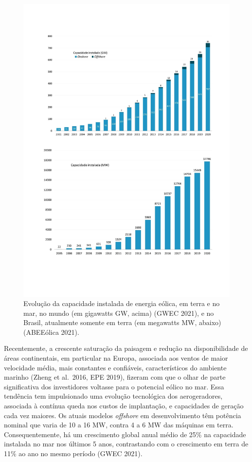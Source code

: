 \documentclass[
  oneside]{scrbook}
\begin{document}
\begin{figure}[H]

{\centering \includegraphics[width=0.75\linewidth]{imagens/cap08/Figura_8.1ab} 

}

\caption{Evolução da capacidade instalada de energia eólica, em terra e no mar, no mundo (em gigawatts GW, acima) (GWEC 2021), e no Brasil, atualmente somente em terra (em megawatts MW, abaixo) (ABEEólica 2021).}\label{fig:61}
\end{figure}

Recentemente, a crescente saturação da paisagem e redução na disponibilidade de áreas continentais, em particular na Europa, associada aos ventos de maior velocidade média, mais constantes e confiáveis, característicos do ambiente marinho (Zheng et al.~2016, EPE 2019), fizeram com que o olhar de parte significativa dos investidores voltasse para o potencial eólico no mar. Essa tendência tem impulsionado uma evolução tecnológica dos aerogeradores, associada à contínua queda nos custos de implantação, e capacidades de geração cada vez maiores. Os atuais modelos \emph{offshore} em desenvolvimento têm potência nominal que varia de 10 a 16 MW, contra 4 a 6 MW das máquinas em terra. Consequentemente, há um crescimento global anual médio de 25\% na capacidade instalada no mar nos últimos 5 anos, contrastando com o crescimento em terra de 11\% ao ano no mesmo período (GWEC 2021).
\end{document}
